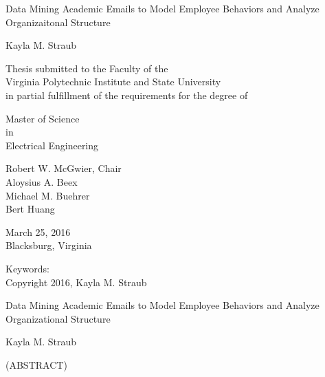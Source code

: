\documentclass[12pt]{report}
\begin{document}
\thispagestyle{empty}
\begin{center}

{\Large 
Data Mining Academic Emails to Model Employee Behaviors and Analyze Organizaitonal Structure
}

\vfill

Kayla M. Straub

\vfill

Thesis submitted to the Faculty of the \\
Virginia Polytechnic Institute and State University \\
in partial fulfillment of the requirements for the degree of

\vfill

Master of Science \\
in \\
Electrical Engineering
\vfill

Robert W. McGwier, Chair \\
Aloysius A. Beex\\
Michael M. Buehrer\\
Bert Huang

\vfill

March 25, 2016 \\
Blacksburg, Virginia

\vfill

Keywords: 
\\
Copyright 2016, Kayla M. Straub

\end{center}

\pagebreak

\thispagestyle{empty}
\begin{center}

{\large Data Mining Academic Emails to Model Employee Behaviors and Analyze Organizational Structure}

\vfill

Kayla M. Straub

\vfill

(ABSTRACT)

\vfill

\end{center}
\end{document}
